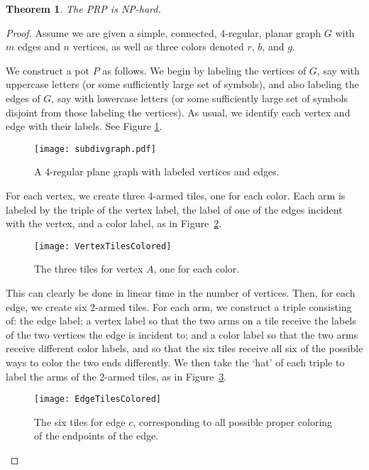 \documentclass{elsarticle}
\newtheorem{theorem}{Theorem}[section]
\theoremstyle{definition}
\theoremstyle{remark}
\theoremstyle{plain}
\theoremstyle{plain}
\begin{document}
\begin{theorem} \label{PRPhard} The \textsc{PRP} is NP-hard.
\end{theorem}

\begin{proof}
Assume we are given a simple, connected, 4-regular, planar graph $G$ with $m$ edges and $n$ vertices, as well as three colors denoted $r$, $b$, and $g$.  

We construct a pot $P$ as follows.  We begin by labeling the vertices of $G$, say with uppercase letters (or some sufficiently large set of symbols), and also labeling the edges of $G$, say with lowercase letters (or some sufficiently large set of symbols disjoint from those labeling the vertices). As usual, we identify each vertex and edge with their labels. See Figure \ref{LabeledGraph}. 
\begin{figure}
  \centering 
  
  \texttt{[image: subdivgraph.pdf]}
  \caption{A 4-regular plane graph with labeled vertices and edges.}
  \label{LabeledGraph}
  \end{figure} 
  
For each vertex, we create three 4-armed tiles, one for each color.  Each arm is labeled by the triple of the vertex label, the label of one of the edges incident with the vertex, and a color label, as in Figure~\ref{VertexTilesColored}. 
\begin{figure}
    \centering \texttt{[image: VertexTilesColored]} \caption{The three tiles for vertex $A$, one for each color.} 
    \label{VertexTilesColored}
    \end{figure} 
    
This can clearly be done in linear time in the number of vertices.  Then, for each edge, we create six 2-armed tiles.  For each arm, we construct a triple consisting of: the edge label; a vertex label so that the two arms on a tile receive the labels of the two vertices the edge is incident to; and a color label so that the two arms receive different color labels, and so that the six tiles receive all six of the possible ways to color the two ends differently. We then take the `hat' of each triple to label the arms of the 2-armed tiles, as in Figure~\ref{EdgeTilesColored}.   
 \begin{figure}
     \centering \texttt{[image: EdgeTilesColored]} \caption{The six tiles for edge $c$, corresponding to all possible proper coloring of the endpoints of the edge.}
     \label{EdgeTilesColored}
     \end{figure} 
     

\end{proof}
\end{document}
